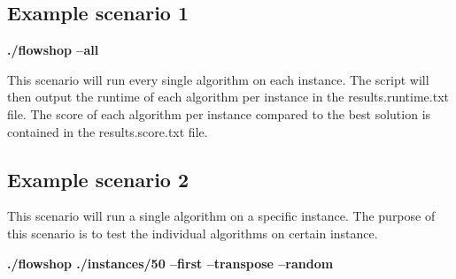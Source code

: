 \documentclass[]{article}
\begin{document}
	
	
	
	\subsection{Example scenario 1}
	
	\textbf{./flowshop --all}\newline
	
	This scenario will run every single algorithm on each instance.\newline
	The script will then output the runtime of each algorithm per instance in the results.runtime.txt file.\newline
	The score of each algorithm per instance compared to the best solution is contained in the results.score.txt file.
	
	\subsection{Example scenario 2}
	This scenario will run a single algorithm on a specific instance. 
	The purpose of this scenario is to test the individual algorithms on certain instance.
	
	\textbf{./flowshop ./instances/50 --first --transpose --random}\newline
	
	
	
	
\end{document}
